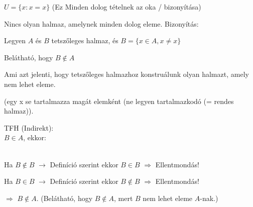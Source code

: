 \begin{frame}
  \begin{tcolorbox}[title={Russel-paradoxon}]
    $U = \{x : x = x \}$ (Ez Minden dolog tételnek az oka / bizonyítása)
  \end{tcolorbox}

  \begin{tcolorbox}[title={Tétel: Minden dolog halmaza}]
    Nincs olyan halmaz, amelynek minden dolog eleme.
  \tcblower
    Bizonyítás:\\
    \mmedskip

    Legyen $A$ és $B$ tetszőleges halmaz, és $B = \{x \in A, x \neq x \}$
    \msmallskip
    
    Belátható, hogy $B \notin A$
    \msmallskip
    
    Ami azt jelenti, hogy tetszőleges halmazhoz konstruálunk olyan halmazt, amely nem lehet eleme.\\
    \mtinyskip
    
    (egy x se tartalmazza magát elemként (ne legyen tartalmazkodó (= rendes halmaz)).\\
    \mmedskip

    TFH (Indirekt):\\
    $B \in A$, ekkor:\\

    \\
    \msmallskip

    Ha $B \notin B$ $\rightarrow$ Definíció szerint ekkor $B \in B$ $\Rightarrow$ Ellentmondás!\\
    \msmallskip

    Ha $B \in B$ $\rightarrow$ Definíció szerint ekkor $B \notin B$ $\Rightarrow$ Ellentmondás!\\
    \msmallskip

    $\Rightarrow$ $B \notin A$.
    (Belátható, hogy $B \notin A$, mert $B$ nem lehet eleme $A$-nak.)
  \end{tcolorbox}
\end{frame}

